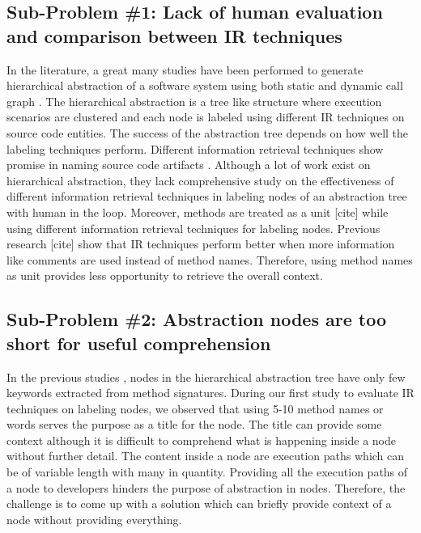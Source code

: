     \subsection{Sub-Problem \#1: Lack of human evaluation and comparison between IR techniques} In the literature, a great many studies have been performed to generate hierarchical abstraction of a software system using both static and dynamic call graph \cite{feng2018hierarchicalExecutionComprehension, gharibi2018automaticStaticCluster, xin2019identifyingFeaturesExecution}. The hierarchical abstraction is a tree like structure where execution scenarios are clustered and each node is labeled using different IR techniques on source code entities. The success of the abstraction tree depends on how well the labeling techniques perform. Different information retrieval techniques show promise in naming source code artifacts \cite{chen2016topicMiningRepositories, panichella2013topicModelsTasks, sun2016surveyTopicSE}. Although a lot of work exist on hierarchical abstraction, they lack comprehensive study on the effectiveness of different information retrieval techniques in labeling nodes of an abstraction tree with human in the loop. Moreover, methods are treated as a unit [cite] while using different information retrieval techniques for labeling nodes. Previous research [cite] show that IR techniques perform better when more information like comments are used instead of method names. Therefore, using method names as unit provides less opportunity to retrieve the overall context.
    

    \subsection{Sub-Problem \#2: Abstraction nodes are too short for useful comprehension}
    In the previous studies \cite{feng2018hierarchicalExecutionComprehension, gharibi2018automaticStaticCluster}, nodes in the hierarchical abstraction tree have only few keywords extracted from method signatures. During our first study to evaluate IR techniques on labeling nodes, we observed that using 5-10 method names or words serves the purpose as a title for the node. The title can provide some context although it is difficult to comprehend what is happening inside a node without further detail. The content inside a node are execution paths which can be of variable length with many in quantity. Providing all the execution paths of a node to developers hinders the purpose of abstraction in nodes. Therefore, the challenge is to come up with a solution which can briefly provide context of a node without providing everything. 
    

